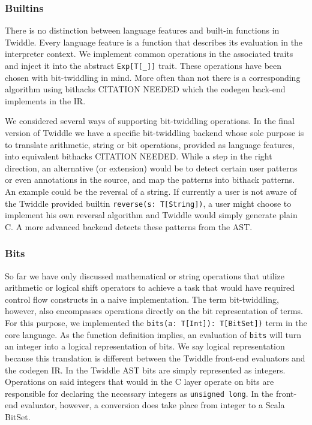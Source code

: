 \documentclass{article}
\begin{document}
\subsubsection{Builtins}
There is no distinction between language features and built-in functions in Twiddle. Every language feature is a function that describes its evaluation in the interpreter context. We implement common operations in the associated traits and inject it into the abstract \texttt{Exp[T[\_]]} trait. These operations have been chosen with bit-twiddling in mind. More often than not there is a corresponding algorithm using bithacks CITATION NEEDED which the codegen back-end implements in the IR.

We considered several ways of supporting bit-twiddling operations. In the final version of Twiddle we have a specific bit-twiddling backend whose sole purpose is to translate arithmetic, string or bit operations, provided as language features, into equivalent bithacks CITATION NEEDED. While a step in the right direction, an alternative (or extension) would be to detect certain user patterns or even annotations in the source, and map the patterns into bithack patterns. An example could be the reversal of a string. If currently a user is not aware of the Twiddle provided builtin \texttt{reverse(s: T[String])}, a user might choose to implement his own reversal algorithm and Twiddle would simply generate plain C. A more advanced backend detects these patterns from the AST.

\subsubsection{Bits}
So far we have only discussed mathematical or string operations that utilize arithmetic or logical shift operators to achieve a task that would have required control flow constructs in a naive implementation. The term bit-twiddling, however, also encompasses operations directly on the bit representation of terms. For this purpose, we implemented the \texttt{bits(a: T[Int]): T[BitSet])} term in the core language. As the function definition implies, an evaluation of \texttt{bits} will turn an integer into a logical representation of bits. We say logical representation because this translation is different between the Twiddle front-end evaluators and the codegen IR. In the Twiddle AST bits are simply represented as integers. Operations on said integers that would in the C layer operate on bits are responsible for declaring the necessary integers as \texttt{unsigned long}. In the front-end evaluator, however, a conversion does take place from integer to a Scala BitSet.
\end{document}
